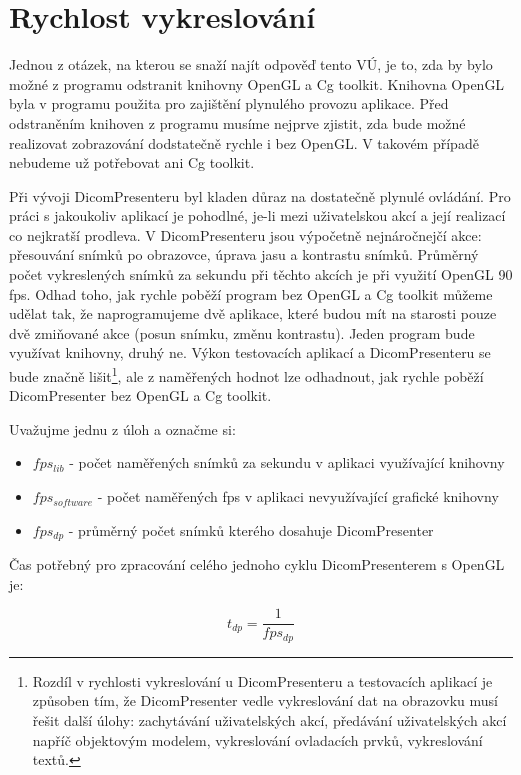 \section{Rychlost vykreslování}
Jednou z otázek, na kterou se snaží najít odpověď tento VÚ, je to, zda by bylo možné z programu odstranit knihovny OpenGL a Cg toolkit. Knihovna OpenGL byla v programu použita pro zajištění plynulého provozu aplikace. Před odstraněním knihoven z programu musíme nejprve zjistit, zda bude možné realizovat zobrazování dodstatečně rychle i bez OpenGL. V takovém případě nebudeme už potřebovat ani Cg toolkit. 

Při vývoji DicomPresenteru byl kladen důraz na dostatečně plynulé ovládání. Pro práci s jakoukoliv aplikací je pohodlné, je-li mezi uživatelskou akcí a její realizací co nejkratší prodleva. V DicomPresenteru jsou výpočetně nejnáročnejčí akce: přesouvání snímků po obrazovce, úprava jasu a kontrastu snímků. Průměrný počet vykreslených snímků za sekundu při těchto akcích je při využití OpenGL 90 fps. Odhad toho, jak rychle poběží program bez OpenGL a Cg toolkit můžeme udělat tak, že naprogramujeme dvě aplikace, které budou mít na starosti pouze dvě zmiňované akce (posun snímku, změnu kontrastu). Jeden program bude využívat knihovny, druhý ne. Výkon testovacích aplikací a DicomPresenteru se bude značně lišit\footnote{Rozdíl v rychlosti vykreslování u DicomPresenteru a testovacích aplikací je způsoben tím, že DicomPresenter vedle vykreslování dat na obrazovku musí řešit další úlohy: zachytávání uživatelských akcí, předávání uživatelských akcí napříč objektovým modelem, vykreslování ovladacích prvků, vykreslování textů.}, ale z naměřených hodnot lze odhadnout, jak rychle poběží DicomPresenter bez OpenGL a Cg toolkit.

Uvažujme jednu z úloh a označme si:
\begin{itemize}
\item $fps_{lib}$ - počet naměřených snímků za sekundu v aplikaci využívající knihovny
\item $fps_{software}$ - počet naměřených fps v aplikaci nevyužívající grafické knihovny
\item $fps_{dp}$ - průměrný počet snímků kterého dosahuje DicomPresenter
\end{itemize}

Čas potřebný pro zpracování celého jednoho cyklu DicomPresenterem s OpenGL je:

\begin{equation}
t_{dp} = \frac{1}{fps_{dp}}
\end{equation}

